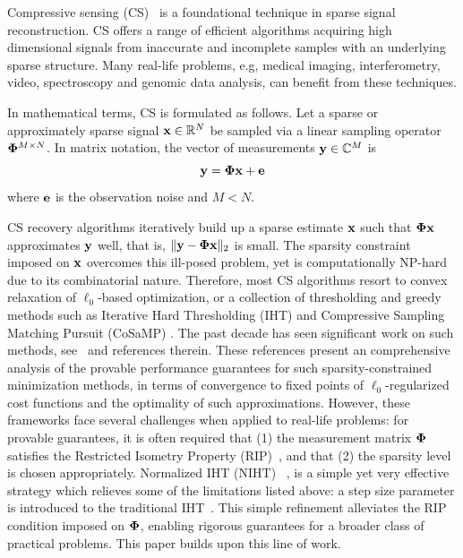 \documentclass[aoas,preprint]{imsart}
\numberwithin{equation}{section}
\theoremstyle{plain}
\begin{document}
Compressive sensing (CS)~\cite{donoho2006cs, candes2006cs, candes2006cs2} is a foundational technique in sparse signal reconstruction. CS offers a range of efficient algorithms acquiring high dimensional signals from inaccurate and incomplete samples with an underlying sparse structure. 
Many real-life problems, e.g, medical imaging, interferometry, video, spectroscopy and genomic data analysis, can benefit from these techniques.
\vspace{0.5em}

In mathematical terms, CS is formulated as follows. Let a sparse or approximately sparse signal ${\bf x}\in \mathbb{R}^N$ be sampled via a linear sampling operator ${\bf \Phi}^{M\times N}$. In matrix notation, the vector of measurements ${\bf y} \in \mathbb{C}^M$ is
\begin{equation}\label{CS_model}
 {\bf y} =  {\bf \Phi}  {\bf x} + {\bf e}
\end{equation}
where ${\bf e}$ is the observation noise and $M < N$.
\vspace{0.5em}

CS recovery algorithms iteratively build up a sparse estimate ${\bf x}$ such that ${\bf \Phi}  {\bf x}$ approximates ${\bf y}$ well, that is,  $\| {\bf y}- {\bf \Phi}  {\bf x} \|_2$ is small. The sparsity constraint imposed on ${\bf x}$ overcomes this ill-posed problem, yet is computationally NP-hard due to its combinatorial nature. 
Therefore, most CS algorithms resort to convex relaxation of $\ell_0$-based optimization, or a collection of thresholding and greedy methods such as Iterative Hard Thresholding (IHT) \cite{blumensath2008iht, blumensath2009iht} and Compressive Sampling Matching Pursuit (CoSaMP) \cite{needel2008cosamp}. The past decade has seen significant work on such methods, see~\cite{liu2017dualiht, yuan2014ht, yuan2016htp, blumensath2013cs, needel2008cosamp} and references therein. These references present an comprehensive analysis of the provable performance guarantees for such sparsity-constrained minimization methods, in terms of convergence to fixed points of $\ell_0$-regularized cost functions and the optimality of such approximations. However, these frameworks face several challenges when applied to real-life problems: for provable guarantees, it is often required that (1) the measurement matrix ${\bf \Phi}$ satisfies the Restricted Isometry Property (RIP)~\cite{candes2008rip, chartrand2008rip}, and that (2) the sparsity level is chosen appropriately. 
Normalized IHT (NIHT)~ \cite{blumensath2010niht}, is a simple yet very effective strategy  which relieves some of the limitations listed above: a step size parameter is introduced to the traditional IHT~\cite{blumensath2008iht}. This simple refinement alleviates the RIP condition imposed on ${\bf \Phi}$, enabling rigorous guarantees for a broader class of practical problems. {This paper
builds upon this line of work.}
\end{document}
